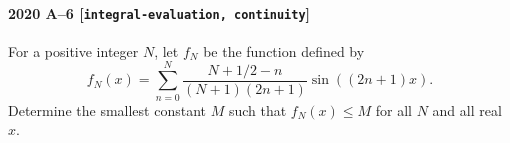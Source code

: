 \paragraph{2020 A--6 \textnormal{[\texttt{integral-evaluation, continuity}]}}
For a positive integer $N$, let $f_N$ be the function defined by
\[
f_N(x) = \sum_{n=0}^N \frac{N+1/2-n}{(N+1)(2n+1)} \sin((2n+1)x).
\]
Determine the smallest constant $M$ such that $f_N(x) \leq M$ for all $N$ and all real $x$.
